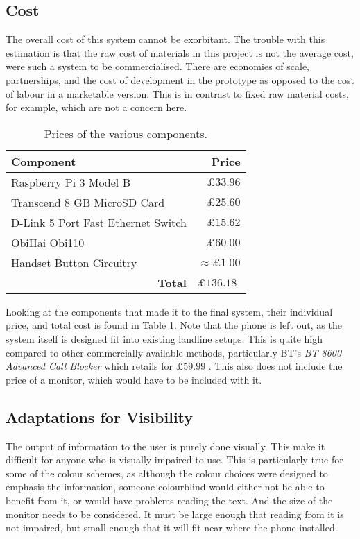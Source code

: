 \documentclass[main.tex]{subfiles}
\begin{document}
\subsection{Cost}
The overall cost of this system cannot be exorbitant. The trouble with this estimation is that the raw cost of materials in this project is not the average cost, were such a system to be commercialised. There are economies of scale, partnerships, and the cost of development in the prototype as opposed to the cost of labour in a marketable version. This is in contrast to fixed raw material costs, for example, which are not a concern here.

\begin{table}[htb]
	\centering
	\begin{tabular}{|l|r|}
		\hline
		\textbf{Component} 							& \textbf{Price}    								\\\hline
		Raspberry Pi 3 Model B        				& $\pounds 33.96$   								\\
		Transcend 8 GB MicroSD Card 				& $\pounds 25.60$   								\\
		D-Link 5 Port Fast Ethernet Switch 			& $\pounds 15.62$   								\\
		ObiHai Obi110           					& $\pounds 60.00$      								\\
		Handset Button Circuitry    				& $\approx \pounds 1.00$ 							\\\hline
		\multicolumn{1}{|r|}{\textbf{Total}}  & \multicolumn{1}{|l|}{$\pounds 136.18$}  	\\\hline
	\end{tabular}
	\caption{Prices of the various components.}
	\label{tbl:costs}
\end{table}

Looking at the components that made it to the final system, their individual price, and total cost is found in Table \ref{tbl:costs}. Note that the phone is left out, as the system itself is designed fit into existing landline setups. This is quite high compared to other commercially available methods, particularly BT's \textit{BT 8600 Advanced Call Blocker} which retails for $\pounds 59.99$ \cite{bt-block}. This also does not include the price of a monitor, which would have to be included with it.

\subsection{Adaptations for Visibility}
The output of information to the user is purely done visually. This make it difficult for anyone who is visually-impaired to use. This is particularly true for some of the colour schemes, as although the colour choices were designed to emphasis the information, someone colourblind would either not be able to benefit from it, or would have problems reading the text. And the size of the monitor needs to be considered. It must be large enough that reading from it is not impaired, but small enough that it will fit near where the phone installed.
\end{document}
